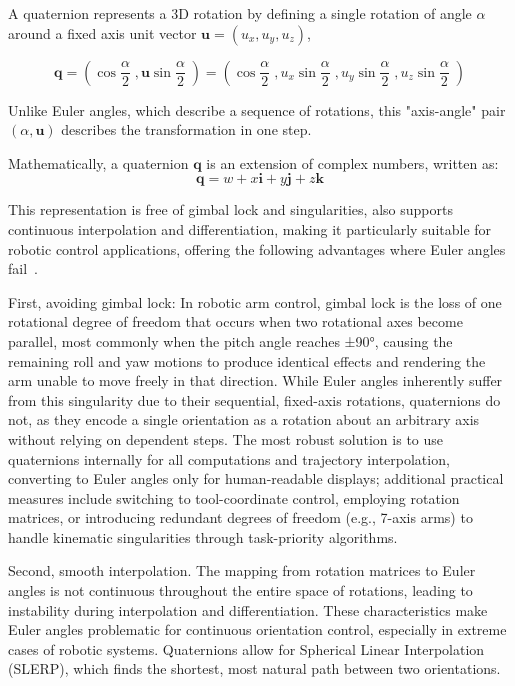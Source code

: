 \documentclass[english,12pt,a4paper,pdftex,elec,utf8]{aaltothesis}
\begin{document}
A quaternion represents a 3D rotation by defining a single rotation of angle $\alpha$ around a fixed axis unit vector $\mathbf{u}=(u_x, u_y, u_z)$, 

$$\mathbf{q}=\left(\cos\frac{\alpha}2\;,\mathbf{u}\sin\frac\alpha2\;\right)=\left(\cos\frac\alpha2\;,u_{x}\sin\frac\alpha2\;,u_{y}\sin\frac\alpha2\;,u_{z}\sin\frac\alpha2\;\right)$$

Unlike Euler angles, which describe a sequence of rotations, this "axis-angle" pair $(\alpha, \mathbf{u})$ describes the transformation in one step.

Mathematically, a quaternion $\mathbf{q}$ is an extension of complex numbers, written as:
$$\mathbf{q}=w+x\mathbf{i}+y\mathbf{j}+z\mathbf{k}$$

This representation is free of gimbal lock and singularities, also supports continuous interpolation and differentiation, making it particularly suitable for robotic control applications, offering the following advantages where Euler angles fail~\cite{robotics}.
 
First, avoiding gimbal lock: In robotic arm control, gimbal lock is the loss of one rotational degree of freedom that occurs when two rotational axes become parallel, most commonly when the pitch angle reaches ±90°, causing the remaining roll and yaw motions to produce identical effects and rendering the arm unable to move freely in that direction. While Euler angles inherently suffer from this singularity due to their sequential, fixed-axis rotations, quaternions do not, as they encode a single orientation as a rotation about an arbitrary axis without relying on dependent steps. The most robust solution is to use quaternions internally for all computations and trajectory interpolation, converting to Euler angles only for human-readable displays; additional practical measures include switching to tool-coordinate control, employing rotation matrices, or introducing redundant degrees of freedom (e.g., 7-axis arms) to handle kinematic singularities through task-priority algorithms.

Second, smooth interpolation. The mapping from rotation matrices to Euler angles is not continuous throughout the entire space of rotations, leading to instability during interpolation and differentiation. These characteristics make Euler angles problematic for continuous orientation control, especially in extreme cases of robotic systems. Quaternions allow for Spherical Linear Interpolation (SLERP), which finds the shortest, most natural path between two orientations.
\end{document}
